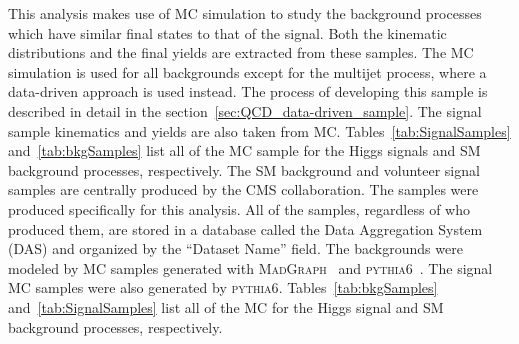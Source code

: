 This analysis makes use of MC simulation to study the background processes which have similar final states to that of the \HWWlvjj signal.
Both the kinematic distributions and the final yields are extracted from these samples.
The MC simulation is used for all backgrounds except for the multijet process, where a data-driven approach is used instead.
The process of developing this sample is described in detail in the section~\ref{sec:QCD_data-driven_sample}.
The signal sample kinematics and yields are also taken from MC.
Tables~\ref{tab:SignalSamples} and~\ref{tab:bkgSamples} list all of the MC sample for the Higgs signals and SM background processes, respectively.
The SM background and volunteer signal samples are centrally produced by the CMS collaboration.
The \ggH samples were produced specifically for this analysis.
All of the samples, regardless of who produced them, are stored in a database called the Data Aggregation System (DAS) and organized by the ``Dataset Name'' field.
The backgrounds were modeled by MC samples generated with \textsc{MadGraph}~\cite{Alwall:2014hca} and \textsc{pythia6}~\cite{1126-6708-2006-05-026}. 
The signal MC samples were also generated by \textsc{pythia6}.
Tables~\ref{tab:bkgSamples} and~\ref{tab:SignalSamples} list all of the MC for the Higgs signal and SM background processes, respectively.

